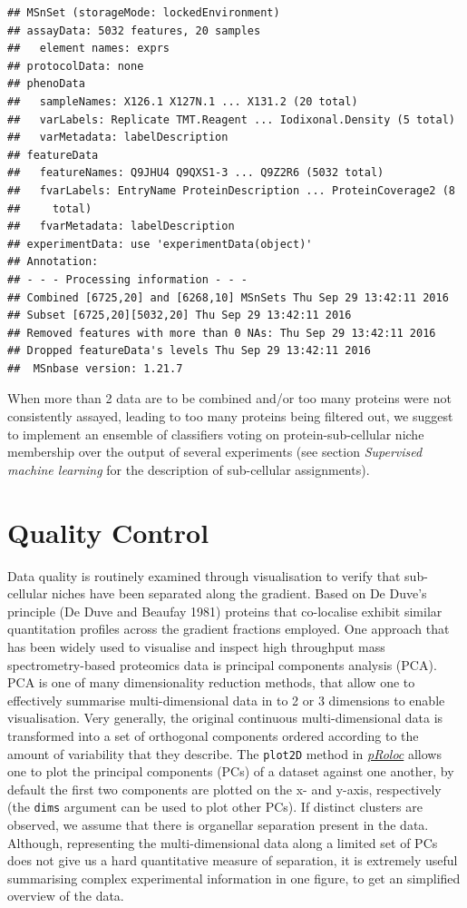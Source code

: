 \begin{verbatim}
## MSnSet (storageMode: lockedEnvironment)
## assayData: 5032 features, 20 samples 
##   element names: exprs 
## protocolData: none
## phenoData
##   sampleNames: X126.1 X127N.1 ... X131.2 (20 total)
##   varLabels: Replicate TMT.Reagent ... Iodixonal.Density (5 total)
##   varMetadata: labelDescription
## featureData
##   featureNames: Q9JHU4 Q9QXS1-3 ... Q9Z2R6 (5032 total)
##   fvarLabels: EntryName ProteinDescription ... ProteinCoverage2 (8
##     total)
##   fvarMetadata: labelDescription
## experimentData: use 'experimentData(object)'
## Annotation:  
## - - - Processing information - - -
## Combined [6725,20] and [6268,10] MSnSets Thu Sep 29 13:42:11 2016 
## Subset [6725,20][5032,20] Thu Sep 29 13:42:11 2016 
## Removed features with more than 0 NAs: Thu Sep 29 13:42:11 2016 
## Dropped featureData's levels Thu Sep 29 13:42:11 2016 
##  MSnbase version: 1.21.7
\end{verbatim}

When more than 2 data are to be combined and/or too many proteins were
not consistently assayed, leading to too many proteins being filtered
out, we suggest to implement an ensemble of classifiers voting on
protein-sub-cellular niche membership over the output of several
experiments (see section \emph{Supervised machine learning} for the
description of sub-cellular assignments).

\section{Quality Control}\label{quality-control}

Data quality is routinely examined through visualisation to verify that
sub-cellular niches have been separated along the gradient. Based on De
Duve's principle (De Duve and Beaufay 1981) proteins that co-localise
exhibit similar quantitation profiles across the gradient fractions
employed. One approach that has been widely used to visualise and
inspect high throughput mass spectrometry-based proteomics data is
principal components analysis (PCA). PCA is one of many dimensionality
reduction methods, that allow one to effectively summarise
multi-dimensional data in to 2 or 3 dimensions to enable visualisation.
Very generally, the original continuous multi-dimensional data is
transformed into a set of orthogonal components ordered according to the
amount of variability that they describe. The \texttt{plot2D} method in
\emph{\href{http://bioconductor.org/packages/pRoloc}{pRoloc}} allows one
to plot the principal components (PCs) of a dataset against one another,
by default the first two components are plotted on the x- and y-axis,
respectively (the \texttt{dims} argument can be used to plot other PCs).
If distinct clusters are observed, we assume that there is organellar
separation present in the data. Although, representing the
multi-dimensional data along a limited set of PCs does not give us a
hard quantitative measure of separation, it is extremely useful
summarising complex experimental information in one figure, to get an
simplified overview of the data.

